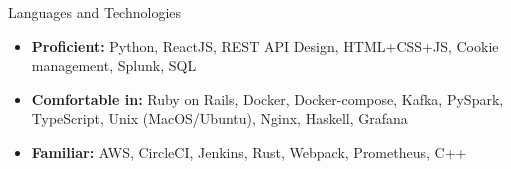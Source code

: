 \documentclass[]{mcdowellcv}
\begin{document}
	\begin{cvsection}{Languages and Technologies}
		\begin{cvsubsection}{}{}{}	
			\begin{itemize}
				\item \textbf{Proficient:} Python, ReactJS, REST API Design, HTML+CSS+JS, Cookie management, Splunk, SQL
				\item \textbf{Comfortable in:} Ruby on Rails, Docker, Docker-compose, Kafka, PySpark, TypeScript, Unix (MacOS/Ubuntu), Nginx, Haskell, Grafana
				\item \textbf{Familiar:} AWS, CircleCI, Jenkins, Rust, Webpack, Prometheus, C++
			\end{itemize}
		\end{cvsubsection}
	\end{cvsection}
\end{document}
